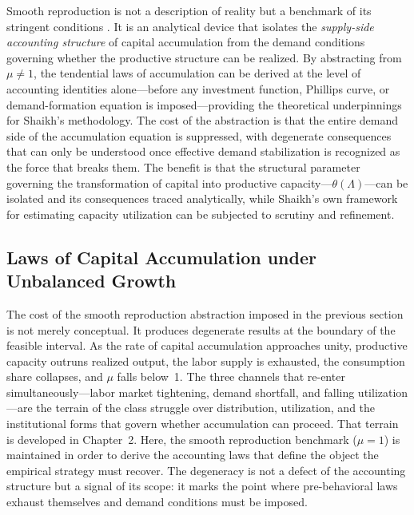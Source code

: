 \documentclass[11pt,a4paper]{article}
\begin{document}
Smooth reproduction is not a description of reality but a benchmark of its stringent conditions \citep{Okishio2022}. It is an analytical device that isolates the \textit{supply-side accounting structure} of capital accumulation from the demand conditions governing whether the productive structure can be realized. By abstracting from $\mu \neq 1$, the tendential laws of accumulation can be derived at the level of accounting identities alone---before any investment function, Phillips curve, or demand-formation equation is imposed---providing the theoretical underpinnings for Shaikh's methodology. The cost of the abstraction is that the entire demand side of the accumulation equation is suppressed, with degenerate consequences that can only be understood once effective demand stabilization is recognized as the force that breaks them. The benefit is that the structural parameter governing the transformation of capital into productive capacity---$\theta(\Lambda)$---can be isolated and its consequences traced analytically, while Shaikh's own framework for estimating capacity utilization can be subjected to scrutiny and refinement.



\subsection{Laws of Capital Accumulation under Unbalanced Growth}
\label{sec:accounting_laws}

The cost of the smooth reproduction abstraction imposed in the previous section is not merely conceptual. It produces degenerate results at the boundary of the feasible interval. As the rate of capital accumulation approaches unity, productive capacity outruns realized output, the labor supply is exhausted, the consumption share collapses, and $\mu$ falls below~1. The three channels that re-enter simultaneously---labor market tightening, demand shortfall, and falling utilization---are the terrain of the class struggle over distribution, utilization, and the institutional forms that govern whether accumulation can proceed. That terrain is developed in Chapter~2. Here, the smooth reproduction benchmark ($\mu = 1$) is maintained in order to derive the accounting laws that define the object the empirical strategy must recover. The degeneracy is not a defect of the accounting structure but a signal of its scope: it marks the point where pre-behavioral laws exhaust themselves and demand conditions must be imposed.
\end{document}
